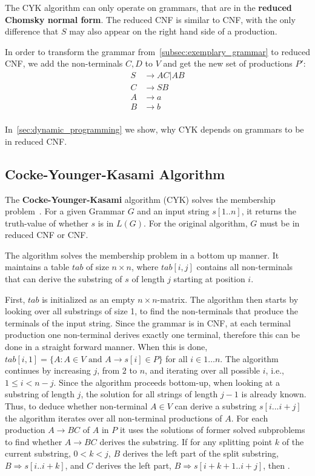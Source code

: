 The CYK algorithm can only operate on grammars, that are in the \textbf{reduced Chomsky normal form}.
The reduced CNF is similar to CNF, with the only difference that $S$ may also appear on the right hand side of a production.

In order to transform the grammar from~\cref{subsec:exemplary_grammar} to reduced CNF, we add the non-terminals $C,D$ to $V$ and get the new set of productions $P'$:
\begin{align*}
    S&\rightarrow AC | AB \\
    C&\rightarrow SB \\
    A&\rightarrow a \\
    B&\rightarrow b \\
\end{align*}

In~\cref{sec:dynamic_programming} we show, why CYK depends on grammars to be in reduced CNF.

\subsection{Cocke-Younger-Kasami Algorithm}

The \textbf{Cocke-Younger-Kasami} algorithm (CYK) solves the membership problem~\cite{automata}.
For a given Grammar $G$ and an input string $s[1..n]$, it returns the truth-value of whether $s$ is in $L(G)$.
For the original algorithm, $G$ must be in reduced CNF or CNF.

The algorithm solves the membership problem in a bottom up manner.
It maintains a table $tab$ of size $n\times n$, where $tab[i,j]$ contains all non-terminals that can derive the substring of $s$ of length $j$ starting at position $i$.

First, $tab$ is initialized as an empty $n\times n$-matrix.
The algorithm then starts by looking over all substrings of size 1, to find the non-terminals that produce the terminals of the input string.
Since the grammar is in CNF, at each terminal production one non-terminal derives exactly one terminal, therefore this can be done in a straight forward manner.
When this is done, $tab[i,1]=\{A: A\in V \text{ and } A\rightarrow s[i] \in P\}$ for all $i\in {1\dots n}$.
The algorithm continues by increasing $j$, from $2$ to $n$, and iterating over all possible $i$, i.e., $1\leq i < n-j$.
Since the algorithm proceeds bottom-up, when looking at a substring of length $j$, the solution for all strings of length $j-1$ is already known.
Thus, to deduce whether non-terminal $A\in V$ can derive a substring $s[i...i+j]$ the algorithm iterates over all non-terminal productions of $A$.
For each production $A\rightarrow BC$ of $A$ in $P$ it uses the solutions of former solved subproblems to find whether $A\rightarrow BC$ derives the substring.
If for any splitting point $k$ of the current substring, $0 < k < j$, $B$ derives the left part of the split substring, $B\Rightarrow s[i..i+k]$, and $C$ derives the left part, $B\Rightarrow s[i+k+1..i+j]$, then .

